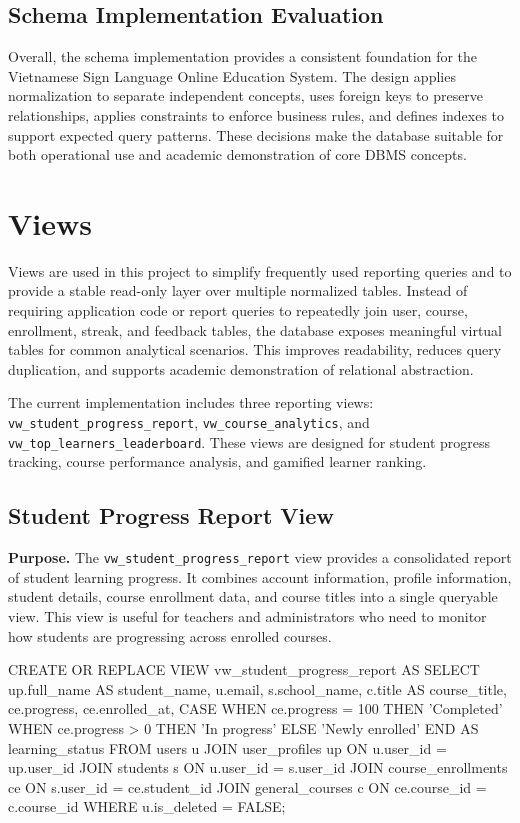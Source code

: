 \subsection{Schema Implementation Evaluation}

Overall, the schema implementation provides a consistent foundation for the Vietnamese Sign Language Online Education System. The design applies normalization to separate independent concepts, uses foreign keys to preserve relationships, applies constraints to enforce business rules, and defines indexes to support expected query patterns. These decisions make the database suitable for both operational use and academic demonstration of core DBMS concepts.

\section{Views}

Views are used in this project to simplify frequently used reporting queries and to provide a stable read-only layer over multiple normalized tables. Instead of requiring application code or report queries to repeatedly join user, course, enrollment, streak, and feedback tables, the database exposes meaningful virtual tables for common analytical scenarios. This improves readability, reduces query duplication, and supports academic demonstration of relational abstraction.

The current implementation includes three reporting views: \texttt{vw\_student\_progress\_report}, \texttt{vw\_course\_analytics}, and \texttt{vw\_top\_learners\_leaderboard}. These views are designed for student progress tracking, course performance analysis, and gamified learner ranking.

\subsection{Student Progress Report View}

\textbf{Purpose.} The \texttt{vw\_student\_progress\_report} view provides a consolidated report of student learning progress. It combines account information, profile information, student details, course enrollment data, and course titles into a single queryable view. This view is useful for teachers and administrators who need to monitor how students are progressing across enrolled courses.

\begin{sqlcode}[caption={Student progress report view},label={lst:view-student-progress-report}]
CREATE OR REPLACE VIEW vw_student_progress_report AS
SELECT
    up.full_name AS student_name,
    u.email,
    s.school_name,
    c.title AS course_title,
    ce.progress,
    ce.enrolled_at,
    CASE
        WHEN ce.progress = 100 THEN 'Completed'
        WHEN ce.progress > 0 THEN 'In progress'
        ELSE 'Newly enrolled'
    END AS learning_status
FROM users u
JOIN user_profiles up ON u.user_id = up.user_id
JOIN students s ON u.user_id = s.user_id
JOIN course_enrollments ce ON s.user_id = ce.student_id
JOIN general_courses c ON ce.course_id = c.course_id
WHERE u.is_deleted = FALSE;
\end{sqlcode}

